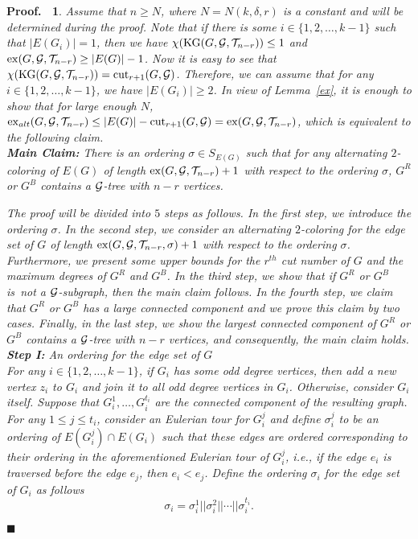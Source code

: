 \documentclass[11pt]{article}
\newtheorem{preproof}{{\bf Proof.\ }}
\newenvironment{proof}[1]{\begin{preproof}{\rm
               #1}\hfill{$\blacksquare$}}{\end{preproof}}
\begin{document}
\begin{proof}{
Assume that $n\geq N$, where $N=N(k,\delta,r)$ is a constant and will be determined during the proof. 
Note that if there is some $i\in\{1,2,\ldots,k-1\}$ such that $|E(G_i)|=1$, then we have
$\chi({\rm KG}(G, {\cal G}, {\cal T}_{n-r}))\leq 1$ and
${\rm ex}(G, {\cal G}, {\cal T}_{n-r})\geq |E(G)|-1$. Now it is easy to see that 
$\chi({\rm KG}(G, {\cal G}, {\cal T}_{ n-r}))={\rm cut}_{r+1}(G, {\cal G})$. 
Therefore, we can assume that for any $i\in\{1,2,\ldots,k-1\}$, we have $|E(G_i)|\geq 2$.
In view of Lemma~\ref{ex}, it is enough to show that for large enough $N$, 
${\rm ex}_{alt}(G,{\cal G}, {\cal T}_{n-r})\leq |E(G)|-{\rm cut}_{r+1}(G,{\cal G})={\rm ex}(G,{\cal G},{\cal T}_{n-r})$, which 
is equivalent to the following claim.\\ 

{\bf Main Claim:} There is an ordering $\sigma\in S_{E(G)}$ such that for any alternating $2$-coloring of $E(G)$ of length ${\rm ex}(G,{\cal G},{\cal T}_{n-r})+1$ with respect to the ordering $\sigma$,  
$G^R$ or $G^B$ contains a ${\cal G}$-tree with $n-r$ vertices. 

The proof will be divided into $5$ steps as follows. In the first step, we introduce the ordering $\sigma$. In the second step, 
we consider an alternating $2$-coloring for the edge set of $G$ of length ${\rm ex}(G,{\cal G},{\cal T}_{n-r}, \sigma)+1$ with respect to the ordering $\sigma$. 
Furthermore, we present some upper bounds for  
the $r^{th}$ cut number of $G$ and the maximum degrees of $G^R$ and $G^B$. 
In the third step, we show that if $G^R$ or $G^B$ is~not a ${\cal G}$-subgraph, then the main claim follows. 
In the fourth step, we claim that $G^R$ or $G^B$ has a 
large connected component and we prove this claim by two cases. Finally, in the last step, we show  
the largest connected component of $G^R$ or $G^B$ contains a  ${\cal G}$-tree with $n-r$ vertices, and consequently, 
the main claim holds.\\

{\bf Step I:} An ordering for the edge set of $G$\\ 
For any $i\in\{1,2,\ldots,k-1\}$, if $G_i$ has some odd degree vertices, then add a new vertex
$z_i$ to $G_i$ and join it to all odd degree vertices in $G_i$. Otherwise, consider $G_i$ itself. Suppose that $G_i^1,\ldots,G_i^{t_i}$ are the connected component of 
the resulting graph. For any $1\leq j\leq t_i$, consider an Eulerian tour for $G_i^j$ and define $\sigma_i^j$
to be an ordering of $E(G_i^j)\cap E(G_i)$
such that these edges are ordered corresponding to their ordering in the aforementioned 
Eulerian tour of $G_i^j$, i.e., if the edge $e_i$ is traversed before the edge $e_j$, then $e_i<e_j$. Define the 
ordering $\sigma_i$ for the edge set of $G_i$ as follows 
$$\sigma_i=\sigma_i^1||\sigma_i^2||\cdots||\sigma_i^{t_i}.$$ 

}
\end{proof}
\end{document}

